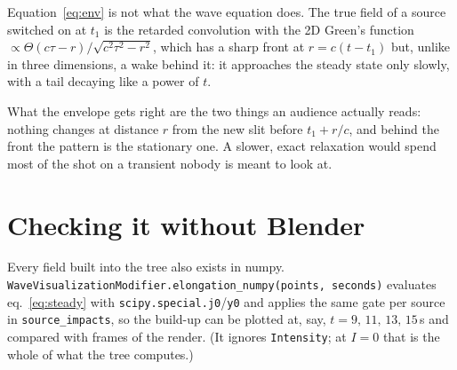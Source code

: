 \documentclass[11pt,a4paper]{article}
\newcommand{\node}[1]{\texttt{#1}}
\begin{document}
Equation~\eqref{eq:env} is not what the wave equation does. The true field of
a source switched on at $t_1$ is the retarded convolution with the 2D Green's
function $\propto \Theta(c\tau-r)/\sqrt{c^2\tau^2-r^2}$, which has a sharp
front at $r=c(t-t_1)$ but, unlike in three dimensions, a wake behind it: it
approaches the steady state only slowly, with a tail decaying like a power of
$t$.

What the envelope gets right are the two things an audience actually reads:
nothing changes at distance $r$ from the new slit before $t_1+r/c$, and behind
the front the pattern is the stationary one. A slower, exact relaxation would
spend most of the shot on a transient nobody is meant to look at.

\section{Checking it without Blender}

Every field built into the tree also exists in numpy.
\node{WaveVisualizationModifier.elongation\_numpy(points, seconds)} evaluates
eq.~\eqref{eq:steady} with \node{scipy.special.j0}/\node{y0} and applies the
same gate per source in \node{source\_impacts}, so the build-up can be
plotted at, say, $t=9,\,11,\,13,\,15\,$s and compared with frames of the
render. (It ignores \node{Intensity}; at $I=0$ that is the whole of what the
tree computes.)
\end{document}
